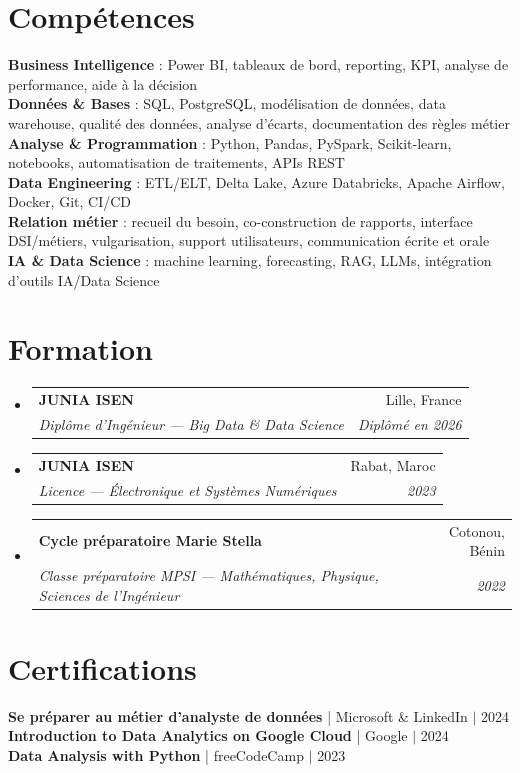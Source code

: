 \documentclass[letterpaper,11pt]{article}
\makeatletter
\newcommand{\resumeSubheading}[4]{
  \vspace{1pt}\item
    \begin{tabular*}{0.97\textwidth}[t]{l@{\extracolsep{\fill}}r}
      {\color{primary}\textbf{#1}} & #2 \\
      \textit{\small#3} & \textit{\small #4} \\
    \end{tabular*}\vspace{-4pt}
}
\newcommand{\resumeSubHeadingListStart}{\begin{itemize}[leftmargin=0.15in, label={}]}
\newcommand{\resumeSubHeadingListEnd}{\end{itemize}}
\makeatother
\begin{document}
\section{Compétences}
\begin{itemize}[leftmargin=0.15in, label={}]
\small{\item{
\textbf{Business Intelligence} : Power BI, tableaux de bord, reporting, KPI, analyse de performance, aide à la décision \\
\textbf{Données \& Bases} : SQL, PostgreSQL, modélisation de données, data warehouse, qualité des données, analyse d'écarts, documentation des règles métier \\
\textbf{Analyse \& Programmation} : Python, Pandas, PySpark, Scikit-learn, notebooks, automatisation de traitements, APIs REST \\
\textbf{Data Engineering} : ETL/ELT, Delta Lake, Azure Databricks, Apache Airflow, Docker, Git, CI/CD \\
\textbf{Relation métier} : recueil du besoin, co-construction de rapports, interface DSI/métiers, vulgarisation, support utilisateurs, communication écrite et orale \\
\textbf{IA \& Data Science} : machine learning, forecasting, RAG, LLMs, intégration d'outils IA/Data Science
}}
\end{itemize}

\section{Formation}
\resumeSubHeadingListStart
  \resumeSubheading
    {JUNIA ISEN}{Lille, France}
    {Diplôme d'Ingénieur --- Big Data \& Data Science}{Diplômé en 2026}
  \resumeSubheading
    {JUNIA ISEN}{Rabat, Maroc}
    {Licence --- Électronique et Systèmes Numériques}{2023}
  \resumeSubheading
    {Cycle préparatoire Marie Stella}{Cotonou, Bénin}
    {Classe préparatoire MPSI --- Mathématiques, Physique, Sciences de l'Ingénieur}{2022}
\resumeSubHeadingListEnd

\section{Certifications}
\begin{itemize}[leftmargin=0.15in, label={}]
\small{\item{
\textbf{Se préparer au métier d'analyste de données} | Microsoft \& LinkedIn $|$ 2024 \vspace{1.5pt} \\
\textbf{Introduction to Data Analytics on Google Cloud} | Google $|$ 2024 \vspace{1.5pt} \\
\textbf{Data Analysis with Python} | freeCodeCamp $|$ 2023
}}
\end{itemize}
\end{document}
